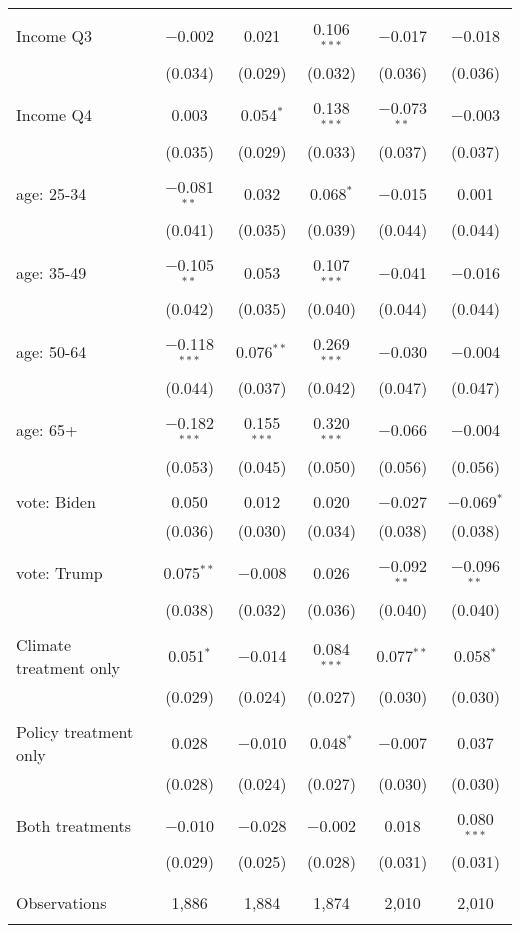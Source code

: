 \begin{tabular}{@{\extracolsep{5pt}}lccccc}
  & & & & & \\ 
 Income Q3 & $-$0.002 & 0.021 & 0.106$^{***}$ & $-$0.017 & $-$0.018 \\ 
  & (0.034) & (0.029) & (0.032) & (0.036) & (0.036) \\ 
  & & & & & \\ 
 Income Q4 & 0.003 & 0.054$^{*}$ & 0.138$^{***}$ & $-$0.073$^{**}$ & $-$0.003 \\ 
  & (0.035) & (0.029) & (0.033) & (0.037) & (0.037) \\ 
  & & & & & \\ 
 age: 25-34 & $-$0.081$^{**}$ & 0.032 & 0.068$^{*}$ & $-$0.015 & 0.001 \\ 
  & (0.041) & (0.035) & (0.039) & (0.044) & (0.044) \\ 
  & & & & & \\ 
 age: 35-49 & $-$0.105$^{**}$ & 0.053 & 0.107$^{***}$ & $-$0.041 & $-$0.016 \\ 
  & (0.042) & (0.035) & (0.040) & (0.044) & (0.044) \\ 
  & & & & & \\ 
 age: 50-64 & $-$0.118$^{***}$ & 0.076$^{**}$ & 0.269$^{***}$ & $-$0.030 & $-$0.004 \\ 
  & (0.044) & (0.037) & (0.042) & (0.047) & (0.047) \\ 
  & & & & & \\ 
 age: 65+ & $-$0.182$^{***}$ & 0.155$^{***}$ & 0.320$^{***}$ & $-$0.066 & $-$0.004 \\ 
  & (0.053) & (0.045) & (0.050) & (0.056) & (0.056) \\ 
  & & & & & \\ 
 vote: Biden & 0.050 & 0.012 & 0.020 & $-$0.027 & $-$0.069$^{*}$ \\ 
  & (0.036) & (0.030) & (0.034) & (0.038) & (0.038) \\ 
  & & & & & \\ 
 vote: Trump & 0.075$^{**}$ & $-$0.008 & 0.026 & $-$0.092$^{**}$ & $-$0.096$^{**}$ \\ 
  & (0.038) & (0.032) & (0.036) & (0.040) & (0.040) \\ 
  & & & & & \\ 
 Climate treatment only & 0.051$^{*}$ & $-$0.014 & 0.084$^{***}$ & 0.077$^{**}$ & 0.058$^{*}$ \\ 
  & (0.029) & (0.024) & (0.027) & (0.030) & (0.030) \\ 
  & & & & & \\ 
 Policy treatment only & 0.028 & $-$0.010 & 0.048$^{*}$ & $-$0.007 & 0.037 \\ 
  & (0.028) & (0.024) & (0.027) & (0.030) & (0.030) \\ 
  & & & & & \\ 
 Both treatments & $-$0.010 & $-$0.028 & $-$0.002 & 0.018 & 0.080$^{***}$ \\ 
  & (0.029) & (0.025) & (0.028) & (0.031) & (0.031) \\ 
  & & & & & \\ 
\hline \\[-1.8ex] 

Observations & 1,886 & 1,884 & 1,874 & 2,010 & 2,010 \\ 
\hline 
\hline \\[-1.8ex] 
\end{tabular} 